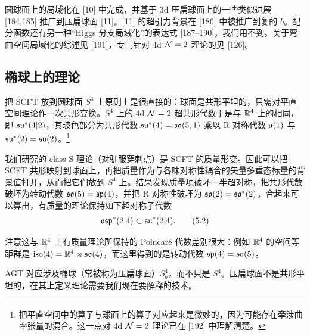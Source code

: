 圆球面上的局域化在 [10] 中完成，并基于 3d 压扁球面上的一些类似进展 [184,185] 推广到压扁球面 [11]。[11] 的超引力背景在 [186] 中被推广到复的 $b$。配分函数还有另一种“Higgs 分支局域化”的表达式 [187--190]，我们用不到。关于弯曲空间局域化的综述见 [191]，专门针对 4d $\mathcal{N}=2$ 理论的见 [126]。


\subsection{椭球上的理论}

 把 SCFT 放到圆球面 $S^4$ 上原则上是很直接的：球面是共形平坦的，只需对平直空间理论作一次共形变换。$S^4$ 上的 4d $\mathcal{N}=2$ 超共形代数于是与 $\mathbb{R}^4$ 上的相同，即 $\mathfrak{su}^*(4|2)$，其玻色部分为共形代数 $\mathfrak{su}^*(4)=\mathfrak{so}(5,1)$ 乘以 R 对称代数 $\mathfrak{u}(1)$ 与 $\mathfrak{su}^*(2)=\mathfrak{su}(2)$。\footnote{把平直空间中的算子与球面上的算子对应起来是微妙的，因为可能存在牵涉曲率张量的混合。这一点对 4d $\mathcal{N}=2$ 理论已在 [192] 中理解清楚。}

我们研究的 class S 理论（对驯服穿刺点）是 SCFT 的质量形变。因此可以把 SCFT 共形映射到球面上，再把质量作为与各味对称性耦合的矢量多重态标量的背景值打开，从而把它们放到 $S^4$ 上。结果发现质量项破坏一半超对称，把共形代数破坏为转动代数 $\mathfrak{so}(5)=\mathfrak{sp}(4)$，并把 R 对称性破坏为 $\mathfrak{so}(2)=\mathfrak{so}^*(2)$。合起来可以算出，有质量的理论保持如下超对称子代数
\begin{equation}
  \mathfrak{osp}^*(2|4)\subset\mathfrak{su}^*(2|4).
  \tag{5.2}
\end{equation}



注意这与 $\mathbb{R}^4$ 上有质量理论所保持的 Poincaré 代数差别很大：例如 $\mathbb{R}^4$ 的空间等距群是 $\mathrm{iso}(4)=\mathbb{R}^4\rtimes\mathfrak{so}(4)$，而这里得到的是转动代数 $\mathfrak{sp}(4)=\mathfrak{so}(5)$。

AGT 对应涉及椭球（常被称为压扁球面）$S^4_b$，而不只是 $S^4$。压扁球面不是共形平坦的，在其上定义理论需要我们现在要解释的技术。

